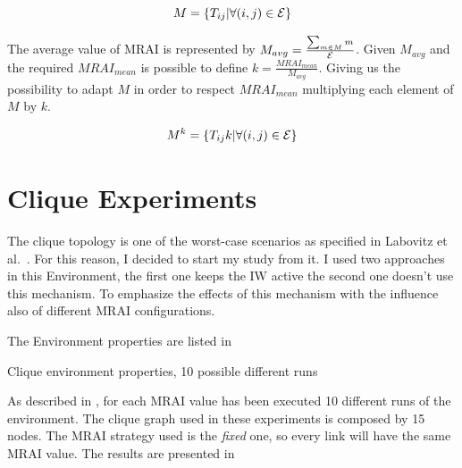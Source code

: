 \[M=\{T_{ij} | \forall (i,j) \in \mathcal{E}\}\]

The average value of \ac{MRAI} is represented by \(M_{avg}=\frac{\sum_{m\in M} m}{\mathcal{E}}\).
Given \(M_{avg}\) and the required \(MRAI_{mean}\) is possible to define
\(k=\frac{MRAI_{mean}}{M_{avg}}\).
Giving us the possibility to adapt \(M\) in order to respect \(MRAI_{mean}\)
multiplying each element of \(M\) by \(k\).

\[M^k=\{T_{ij}k | \forall (i,j) \in \mathcal{E}\}\]

\section{Clique Experiments}
\label{sec:bgp_mrai_clique}

The clique topology is one of the worst-case scenarios as specified in Labovitz et al.~\cite{labovitz2000delayed}.
For this reason, I decided to start my study from it.
I used two approaches in this Environment, the first one keeps the \ac{IW} active
the second one doesn't use this mechanism.
To emphasize the effects of this mechanism with the influence also of different
\ac{MRAI} configurations.

The Environment properties are listed in 

\begin{table}[h]
	
		\caption{Clique environment properties, \num{10} possible different runs}
    \label{tbl:clique_properties}
\end{table}

As described in , for each \ac{MRAI} value has been
executed \num{10} different runs of the environment.
The clique graph used in these experiments is composed by \num{15} nodes.
The \ac{MRAI} strategy used is the \textit{fixed} one, so every link will have the
same \ac{MRAI} value.
The results are presented in 

